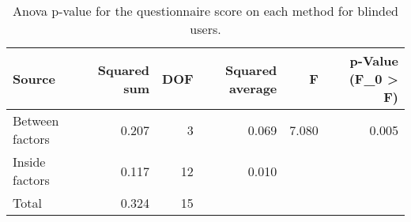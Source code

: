 
\begin{table}[!htb]
\centering
\caption{Anova p-value for the questionnaire score on each method for blinded users.}
\label{tab:anova_questionnaire}
\begin{tabular}{lrrrrr}
\toprule
         Source &  Squared sum &  DOF & Squared average &     F & p-Value (F\_0 > F) \\
\midrule
Between factors &        0.207 &    3 &           0.069 & 7.080 &             0.005 \\
 Inside factors &        0.117 &   12 &           0.010 &       &                   \\
          Total &        0.324 &   15 &                 &       &                   \\
\bottomrule
\end{tabular}
\end{table}

